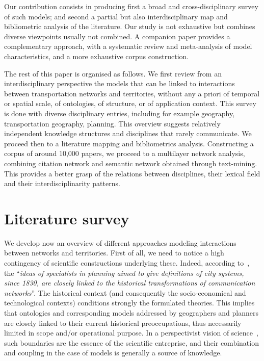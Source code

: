 \documentclass[10pt]{article}
\begin{document}
Our contribution consists in producing first a broad and cross-disciplinary survey of such models; and second a partial but also interdisciplinary map and bibliometric analysis of the literature. Our study is not exhaustive but combines diverse viewpoints usually not combined. A companion paper \cite{raimbault2020systematic} provides a complementary approach, with a systematic review and meta-analysis of model characteristics, and a more exhaustive corpus construction.

The rest of this paper is organised as follows. We first review from an interdisciplinary perspective the models that can be linked to interactions between transportation networks and territories, without any a priori of temporal or spatial scale, of ontologies, of structure, or of application context. This survey is done with diverse disciplinary entries, including for example geography, transportation geography, planning. This overview suggests relatively independent knowledge structures and disciplines that rarely communicate. We proceed then to a literature mapping and bibliometrics analysis. Constructing a corpus of around 10,000 papers, we proceed to a multilayer network analysis, combining citation network and semantic network obtained through text-mining. This provides a better grasp of the relations between disciplines, their lexical field and their interdisciplinarity patterns.




\section{Literature survey}



We develop now an overview of different approaches modeling interactions between networks and territories. First of all, we need to notice a high contingency of scientific constructions underlying these. Indeed, according to~\cite{bretagnolle2002time}, the ``\textit{ideas of specialists in planning aimed to give definitions of city systems, since 1830, are closely linked to the historical transformations of communication networks}''. The historical context (and consequently the socio-economical and technological contexts) conditions strongly the formulated theories. This implies that ontologies and corresponding models addressed by geographers and planners are closely linked to their current historical preoccupations, thus necessarily limited in scope and/or operational purpose. In a perspectivist vision of science~\cite{giere2010scientific}, such boundaries are the essence of the scientific entreprise, and their combination and coupling in the case of models is generally a source of knowledge.
\end{document}
